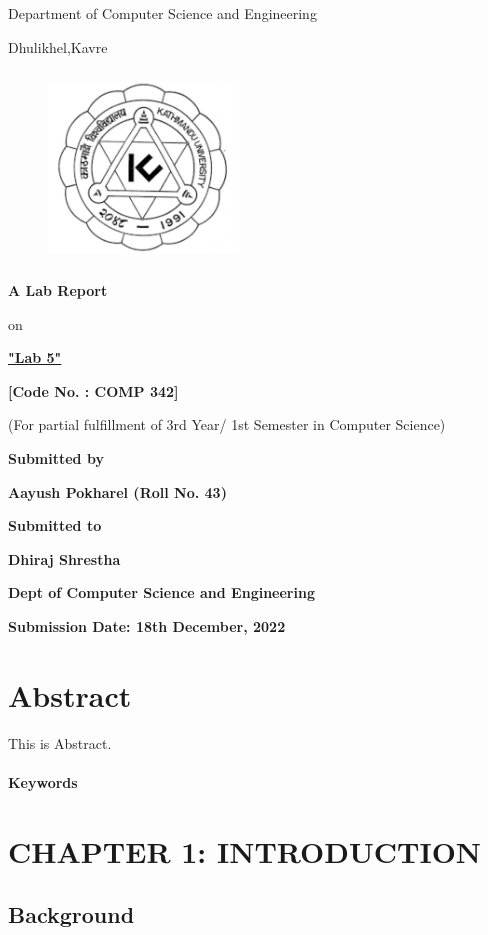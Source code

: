 \documentclass[12pt]{article}
\begin{document}
\thispagestyle{empty}

\section*{}
 {\LARGE{}}

\centerline{Department of Computer Science and Engineering}
\centerline{Dhulikhel,Kavre}
\begin{figure}[h]
    \centerline{\includegraphics[width=50.546mm,height=50.546mm]{KU_Logo.png}}
\end{figure}

\centerline{\textbf{A Lab Report}}
\centerline{on}
\centerline{\underline{\textbf{"Lab 5"}}}

\vspace*{12mm}

\centerline{\textbf{[Code No. : COMP 342]}}
\centerline{(For partial fulfillment of 3rd Year/ 1st Semester in Computer Science)}

\vspace*{20mm}

\centerline{\textbf{Submitted by}}
\centerline{\textbf{Aayush Pokharel (Roll No. 43)}}


\vspace*{26mm}


\centerline{\textbf{Submitted to}}
\centerline{\textbf{Dhiraj Shrestha}}
\centerline{\textbf{Dept of Computer Science and Engineering}}

\vspace*{20mm}

\centerline{\textbf{Submission Date: 18th December, 2022}}



\clearpage
\thispagestyle{empty}

\section*{Abstract}
This is Abstract.
\\\\
\textbf{Keywords }

\clearpage
\thispagestyle{empty}
\tableofcontents

\clearpage
\thispagestyle{empty}
\listoffigures

\clearpage
{}
\section{CHAPTER 1: INTRODUCTION}

\subsection{Background}

\clearpage
\thispagestyle{empty}
\printbibliography
\end{document}
